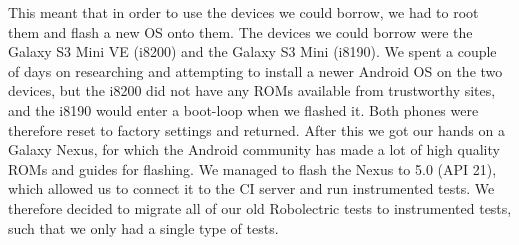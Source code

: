 This meant that in order to use the devices we could borrow, we had to root them and flash a new OS onto them. The devices we could borrow were the Galaxy S3 Mini VE (i8200) and the Galaxy S3 Mini (i8190). We spent a couple of days on researching and attempting to install a newer Android OS on the two devices, but the i8200 did not have any ROMs available from trustworthy sites, and the i8190 would enter a boot-loop when we flashed it. Both phones were therefore reset to factory settings and returned. After this we got our hands on a Galaxy Nexus, for which the Android community has made a lot of high quality ROMs and guides for flashing. We managed to flash the Nexus to 5.0 (API 21), which allowed us to connect it to the CI server and run instrumented tests. We therefore decided to migrate all of our old Robolectric tests to instrumented tests, such that we only had a single type of tests. 
